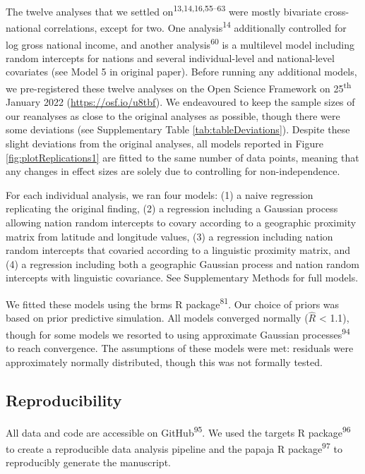 \documentclass[
  man,floatsintext]{apa6}
\begin{document}
The twelve analyses that we settled on\textsuperscript{13,14,16,55--63} were mostly bivariate cross-national correlations, except for two. One analysis\textsuperscript{14} additionally controlled for log gross national income, and another analysis\textsuperscript{60} is a multilevel model including random intercepts for nations and several individual-level and national-level covariates (see Model 5 in original paper). Before running any additional models, we pre-registered these twelve analyses on the Open Science Framework on 25\textsuperscript{th} January 2022 (\url{https://osf.io/u8tbf}). We endeavoured to keep the sample sizes of our reanalyses as close to the original analyses as possible, though there were some deviations (see Supplementary Table \ref{tab:tableDeviations}). Despite these slight deviations from the original analyses, all models reported in Figure \ref{fig:plotReplications1} are fitted to the same number of data points, meaning that any changes in effect sizes are solely due to controlling for non-independence.

For each individual analysis, we ran four models: (1) a naive regression replicating the original finding, (2) a regression including a Gaussian process allowing nation random intercepts to covary according to a geographic proximity matrix from latitude and longitude values, (3) a regression including nation random intercepts that covaried according to a linguistic proximity matrix, and (4) a regression including both a geographic Gaussian process and nation random intercepts with linguistic covariance. See Supplementary Methods for full models.

We fitted these models using the brms R package\textsuperscript{81}. Our choice of priors was based on prior predictive simulation. All models converged normally (\(\hat{R}\) \textless{} 1.1), though for some models we resorted to using approximate Gaussian processes\textsuperscript{94} to reach convergence. The assumptions of these models were met: residuals were approximately normally distributed, though this was not formally tested.

\hypertarget{reproducibility}{%
\subsection{Reproducibility}\label{reproducibility}}

All data and code are accessible on GitHub\textsuperscript{95}. We used the targets R package\textsuperscript{96} to create a reproducible data analysis pipeline and the papaja R package\textsuperscript{97} to reproducibly generate the manuscript.
\end{document}
